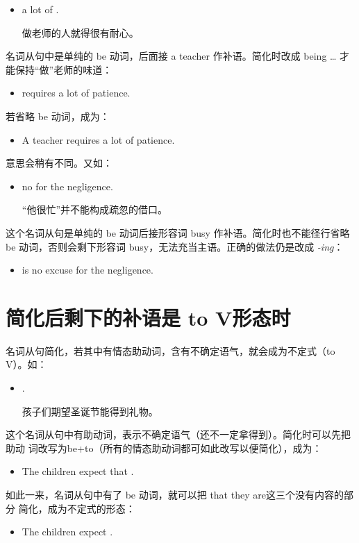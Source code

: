 \begin{itemize}
\item {}  a lot of .

  做老师的人就得很有耐心。
\end{itemize}
名词从句中是单纯的 be 动词，后面接 a teacher 作补语。简化时改成
being \ldots{} 才能保持“做”老师的味道：
\begin{itemize}
\item {} requires a lot of patience.
\end{itemize}
若省略 be 动词，成为：
\begin{itemize}
\item   A teacher requires a lot of patience.
\end{itemize}
意思会稍有不同。又如：
\begin{itemize}
\item {}  no  for the negligence.

  “他很忙”并不能构成疏忽的借口。
\end{itemize}
这个名词从句是单纯的 be 动词后接形容词 busy 作补语。简化时也不能径行省略
be 动词，否则会剩下形容词 busy，无法充当主语。正确的做法仍是改成 \emph{-ing}：
\begin{itemize}
\item {} is no excuse for the negligence.
\end{itemize}

\section{简化后剩下的补语是 to V形态时}

名词从句简化，若其中有情态助动词，含有不确定语气，就会成为不定式（to
V）。如：
\begin{itemize}
\item {}  .

  孩子们期望圣诞节能得到礼物。
\end{itemize}
这个名词从句中有助动词，表示不确定语气（还不一定拿得到）。简化时可以先把助动
词改写为be+to（所有的情态助动词都可如此改写以便简化），成为：
\begin{itemize}
\item The children expect that .
\end{itemize}
如此一来，名词从句中有了 be 动词，就可以把 that they are这三个没有内容的部分
简化，成为不定式的形态：
\begin{itemize}
\item   The children expect .
\end{itemize}

